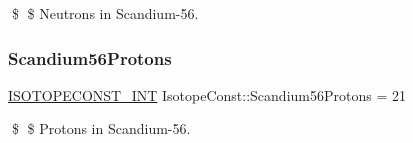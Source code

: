\$ \$ Neutrons in Scandium-\/56. \mbox{\label{group___isotope_const-_scandium-_sc56_gaef4d6475f8fcc70c4b66e444f02f098f}} 
\subsubsection{\texorpdfstring{Scandium56\+Protons}{Scandium56Protons}}
{\footnotesize\ttfamily \mbox{\hyperlink{group___isotope_const-_macros_ga5f18360b3e99483a35c32d789e62621c}{I\+S\+O\+T\+O\+P\+E\+C\+O\+N\+S\+T\+\_\+\+I\+NT}} Isotope\+Const\+::\+Scandium56\+Protons = 21}

\$ \$ Protons in Scandium-\/56. 